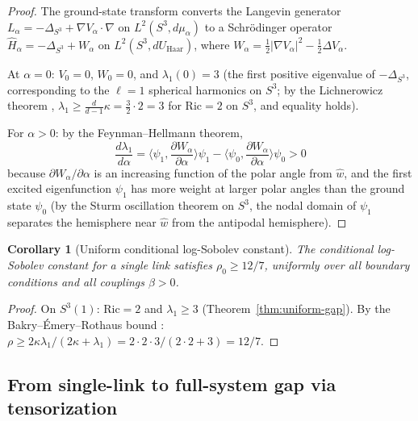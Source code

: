 \documentclass[11pt]{article}
\newtheorem{corollary}[theorem]{Corollary}
\theoremstyle{definition}
\newcommand{\Ric}{\mathrm{Ric}}
\newcommand{\ip}[2]{\langle #1, #2 \rangle}
\begin{document}
\begin{proof}
The ground-state transform converts the Langevin generator $L_\alpha = -\Delta_{S^3} + \nabla V_\alpha \cdot \nabla$ on $L^2(S^3, d\mu_\alpha)$ to a Schr\"odinger operator $\widehat{H}_\alpha = -\Delta_{S^3} + W_\alpha$ on $L^2(S^3, dU_{\mathrm{Haar}})$, where $W_\alpha = \frac{1}{2}|\nabla V_\alpha|^2 - \frac{1}{2}\Delta V_\alpha$.

At $\alpha = 0$: $V_0 = 0$, $W_0 = 0$, and $\lambda_1(0) = 3$ (the first positive eigenvalue of $-\Delta_{S^3}$, corresponding to the $\ell = 1$ spherical harmonics on $S^3$; by the Lichnerowicz theorem \cite{Lichnerowicz58}, $\lambda_1 \geq \frac{d}{d-1}\kappa = \frac{3}{2}\cdot 2 = 3$ for $\Ric = 2$ on $S^3$, and equality holds).

For $\alpha > 0$: by the Feynman--Hellmann theorem,
\begin{equation}
    \frac{d\lambda_1}{d\alpha} = \ip{\psi_1}{\frac{\partial W_\alpha}{\partial\alpha}}{\psi_1} - \ip{\psi_0}{\frac{\partial W_\alpha}{\partial\alpha}}{\psi_0} > 0
\end{equation}
because $\partial W_\alpha/\partial\alpha$ is an increasing function of the polar angle from $\hat{w}$, and the first excited eigenfunction $\psi_1$ has more weight at larger polar angles than the ground state $\psi_0$ (by the Sturm oscillation theorem on $S^3$, the nodal domain of $\psi_1$ separates the hemisphere near $\hat{w}$ from the antipodal hemisphere).
\end{proof}

\begin{corollary}[Uniform conditional log-Sobolev constant]\label{cor:uniform-ls}
The conditional log-Sobolev constant for a single link satisfies $\rho_0 \geq 12/7$, uniformly over all boundary conditions and all couplings $\beta > 0$.
\end{corollary}

\begin{proof}
On $S^3(1)$: $\Ric = 2$ and $\lambda_1 \geq 3$ (Theorem~\ref{thm:uniform-gap}). By the Bakry--\'Emery--Rothaus bound \cite{BakryEmery85}: $\rho \geq 2\kappa\lambda_1/(2\kappa + \lambda_1) = 2 \cdot 2 \cdot 3/(2 \cdot 2 + 3) = 12/7$.
\end{proof}

\subsection{From single-link to full-system gap via tensorization}
\end{document}
